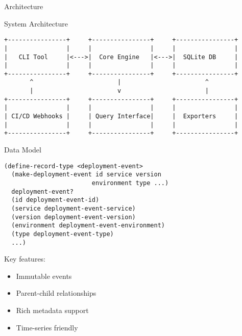 \documentclass[presentation,aspectratio=169]{beamer}
\begin{document}
\begin{frame}[label={sec:orgb68600f},fragile]{Architecture}
 \begin{block}{System Architecture}
\begin{verbatim}
+----------------+     +----------------+     +----------------+
|                |     |                |     |                |
|   CLI Tool     |<--->|  Core Engine   |<--->|  SQLite DB     |
|                |     |                |     |                |
+----------------+     +----------------+     +----------------+
       ^                       |                       ^
       |                       v                       |
+----------------+     +----------------+     +----------------+
|                |     |                |     |                |
| CI/CD Webhooks |     | Query Interface|     |  Exporters     |
|                |     |                |     |                |
+----------------+     +----------------+     +----------------+
\end{verbatim}
\end{block}
\begin{block}{Data Model}
\begin{verbatim}
(define-record-type <deployment-event>
  (make-deployment-event id service version
                        environment type ...)
  deployment-event?
  (id deployment-event-id)
  (service deployment-event-service)
  (version deployment-event-version)
  (environment deployment-event-environment)
  (type deployment-event-type)
  ...)
\end{verbatim}

Key features:
\begin{itemize}
\item Immutable events
\item Parent-child relationships
\item Rich metadata support
\item Time-series friendly
\end{itemize}
\end{block}
\end{frame}
\end{document}
